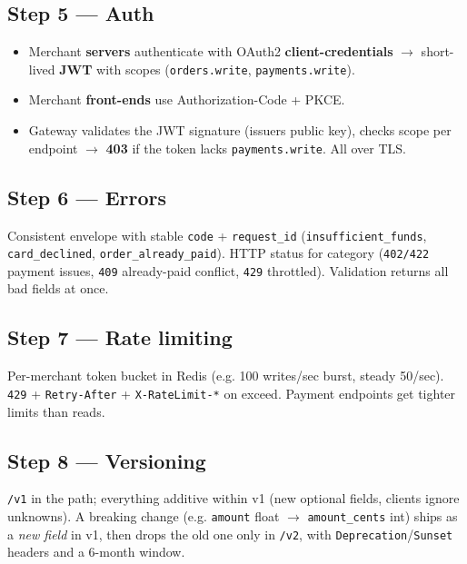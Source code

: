\documentclass[11pt]{article}
\providecommand{\tightlist}{\setlength{\itemsep}{1pt}\setlength{\parskip}{0pt}}
\begin{document}
\subsection{Step 5 --- Auth}\label{step-5--auth}

\begin{itemize}
\tightlist
\item
  Merchant \textbf{servers} authenticate with OAuth2 \textbf{client-credentials} \(\rightarrow\) short-lived \textbf{JWT} with scopes (\texttt{orders.write}, \texttt{payments.write}).
\item
  Merchant \textbf{front-ends} use Authorization-Code + PKCE.
\item
  Gateway validates the JWT signature (issuer\textquotesingle s public key), checks scope per endpoint \(\rightarrow\) \textbf{403} if the token lacks \texttt{payments.write}. All over TLS.
\end{itemize}

\subsection{Step 6 --- Errors}\label{step-6--errors}

Consistent envelope with stable \texttt{code} + \texttt{request\_id} (\texttt{insufficient\_funds}, \texttt{card\_declined}, \texttt{order\_already\_paid}). HTTP status for category (\texttt{402/422} payment issues, \texttt{409} already-paid conflict, \texttt{429} throttled). Validation returns all bad fields at once.

\subsection{Step 7 --- Rate limiting}\label{step-7--rate-limiting}

Per-merchant token bucket in Redis (e.g. 100 writes/sec burst, steady 50/sec). \texttt{429} + \texttt{Retry-After} + \texttt{X-RateLimit-*} on exceed. Payment endpoints get tighter limits than reads.

\subsection{Step 8 --- Versioning}\label{step-8--versioning}

\texttt{/v1} in the path; everything additive within v1 (new optional fields, clients ignore unknowns). A breaking change (e.g. \texttt{amount} float \(\rightarrow\) \texttt{amount\_cents} int) ships as a \emph{new field} in v1, then drops the old one only in \texttt{/v2}, with \texttt{Deprecation}/\texttt{Sunset} headers and a 6-month window.
\end{document}
